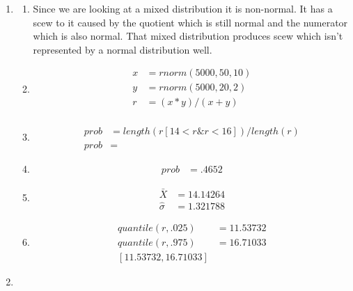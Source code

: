 \documentclass{article}
\begin{document}

\begin{enumerate}
\item
	\begin{enumerate}
	\item
	Since we are looking at a mixed distribution it is non-normal. It has a scew to it caused by the quotient which is still normal and the numerator which is also normal. That mixed distribution produces scew which isn't represented by a normal distribution well. 
	\item
	\begin{equation*}
	\begin{split}
	x &= rnorm(5000, 50, 10) \\
	y &= rnorm(5000, 20, 2) \\
	r &= (x*y)/(x+y) \\
	\end{split}
	\end{equation*}
	\item
	\begin{equation*}
	\begin{split}
	prob &= length(r[14 < r \& r < 16])/length(r) \\
	prob &=
	\end{split}
	\end{equation*}
	\item
	\begin{equation*}
	\begin{split}
	prob &= .4652
	\end{split}
	\end{equation*}
	\item
	\begin{equation*}
	\begin{split}
	\bar{X} &= 14.14264 \\
	\hat{\sigma} &= 1.321788
	\end{split}
	\end{equation*}
	\item
	\begin{equation*}
	\begin{split}
	quantile(r,.025)  &= 11.53732 \\
	quantile(r, .975) & = 16.71033 \\
	[11.53732, 16.71033] 
	\end{split}
	\end{equation*}
	\end{enumerate}
\item

\end{enumerate}
\end{document}
